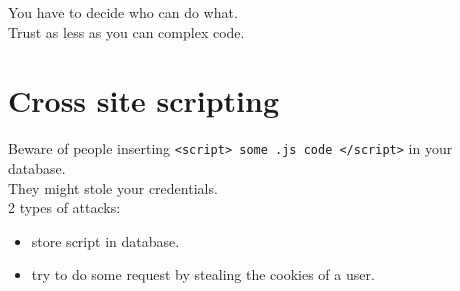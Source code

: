 \documentclass[a4paper,11pt]{article}
\begin{document}
You have to decide who can do what.\\
Trust as less as you can complex code.\\

\section{Cross site scripting}

 Beware of people inserting \texttt{<script> some .js code </script>} in your database.\\
 They might stole your credentials.\\
 

  2 types of attacks:
 \begin{itemize}
   \item  store script in database.
   \item  try to do some request by stealing the cookies of a user.
 \end{itemize}



 
\end{document}
